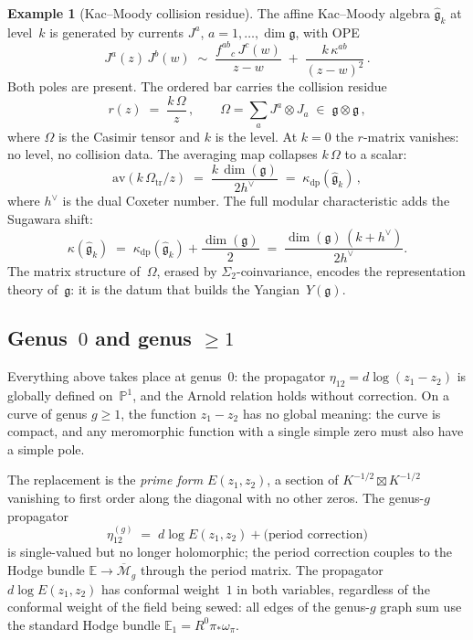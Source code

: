 \documentclass[11pt,reqno]{amsart}
\theoremstyle{definition}
\newtheorem{example}[theorem]{Example}
\theoremstyle{remark}
\newcommand{\cM}{\mathcal{M}}
\newcommand{\fg}{\mathfrak{g}}
\numberwithin{equation}{section}
\begin{document}
\begin{example}[Kac--Moody collision residue]
\label{ex:km}
The affine Kac--Moody algebra $\widehat{\fg}_k$ at
level~$k$ is generated by currents $J^a$,
$a = 1,\ldots,\dim\fg$, with OPE
\[
J^a(z)\,J^b(w)
\;\sim\;
\frac{f^{ab}{}_{c}\,J^c(w)}{z - w}
\;+\;
\frac{k\,\kappa^{ab}}{(z - w)^2}\,.
\]
Both poles are present. The ordered bar carries the collision
residue
\begin{equation}\label{eq:km-r}
r(z)
\;=\;
\frac{k\,\Omega}{z}\,,
\qquad
\Omega = \sum_a J^a \otimes J_a
\;\in\;
\fg \otimes \fg\,,
\end{equation}
where $\Omega$ is the Casimir tensor and $k$ is the level.
At $k = 0$ the $r$-matrix vanishes: no level, no collision
data. The averaging map collapses $k\,\Omega$ to a scalar:
\begin{equation}\label{eq:km-kappa}
\mathrm{av}(k\,\Omega_{\mathrm{tr}}/z)
\;=\;
\frac{k\,\dim(\fg)}{2h^\vee}
\;=\;
\kappa_{\mathrm{dp}}(\widehat{\fg}_k)\,,
\end{equation}
where $h^\vee$ is the dual Coxeter number. The full modular
characteristic adds the Sugawara shift:
\[
\kappa(\widehat{\fg}_k)
\;=\;
\kappa_{\mathrm{dp}}(\widehat{\fg}_k) + \frac{\dim(\fg)}{2}
\;=\;
\frac{\dim(\fg)\,(k+h^\vee)}{2h^\vee}.
\]
The matrix
structure of~$\Omega$, erased by $\Sigma_2$-coinvariance,
encodes the representation theory of~$\fg$: it is the datum
that builds the Yangian~$Y(\fg)$.
\end{example}


\subsection{Genus~$0$ and genus $\ge 1$}
\label{ssec:genus}

Everything above takes place at genus~$0$: the propagator
$\eta_{12} = d\log(z_1 - z_2)$ is globally defined
on~$\mathbb{P}^1$, and the Arnold relation holds without
correction. On a curve of genus $g \ge 1$, the function
$z_1 - z_2$ has no global meaning: the curve is compact,
and any meromorphic function with a single simple zero must
also have a simple pole.

The replacement is the \emph{prime form} $E(z_1, z_2)$, a
section of $K^{-1/2} \boxtimes K^{-1/2}$ vanishing to first
order along the diagonal with no other zeros. The genus-$g$
propagator
\begin{equation}\label{eq:genus-g-prop}
\eta^{(g)}_{12}
\;=\;
d\log E(z_1, z_2)
+ \text{(period correction)}
\end{equation}
is single-valued but no longer holomorphic; the period
correction couples to the Hodge bundle
$\mathbb{E} \to \overline{\cM}_g$ through the period
matrix. The propagator $d\log E(z_1,z_2)$ has conformal
weight~$1$ in both variables, regardless of the conformal
weight of the field being sewed: all edges of the genus-$g$
graph sum use the standard Hodge bundle
$\mathbb{E}_1 = R^0\pi_*\omega_\pi$.
\end{document}
